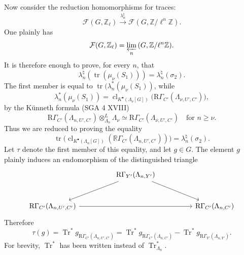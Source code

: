 \documentclass[11pt]{article}
\providecommand{\Tr}{\operatorname{Tr}}
\providecommand{\Tr}{\operatorname{Tr}}
\providecommand{\Tr}{\operatorname{Tr}}
\providecommand{\Tr}{\operatorname{Tr}}
\providecommand{\clKstar}[1]{\operatorname{cl}_{K^{\bullet}(#1)}}
\providecommand{\RG}{\mathrm R\Gamma}
\providecommand{\Tr}{\operatorname{Tr}}
\begin{document}
Now consider the reduction homomorphisms for traces:
\[
\mathcal F(G,\mathbb Z_\ell)\xrightarrow{\lambda_n^\natural}\mathcal F(G,\mathbb Z/\ell^n\mathbb Z).
\]
One plainly has
\[
\mathcal F(G,\mathbb Z_\ell)=\varprojlim_n\mathcal (G,\mathbb Z/\ell^n\mathbb Z).
\]
It is therefore enough to prove, for every $n$, that
\[
\lambda_n^\natural(\operatorname{tr}(\mu_\nu(S_1)))=\lambda_n^\natural(\sigma_2).
\]
The first member is equal to $\operatorname{tr}(\lambda_n^*(\mu_\nu(S_1))$, while
\[
\lambda_n^*(\mu_\nu(S_1))
=
\clKstar{\Lambda_\nu[G]}\bigl(\RG_{C'}(\Lambda_{\nu,U',C'})\bigr),
\]
by the Künneth formula (SGA 4 XVIII)
\[
\RG_{C'}(\Lambda_{n,U',C'})\otimes_{\Lambda_n}^{L}\Lambda_\nu
\simeq \RG_{C'}(\Lambda_{\nu,U',C'})
\quad\text{for } n\ge\nu.
\]
Thus we are reduced to proving the equality
\[
\operatorname{tr}\bigl(\clKstar{\Lambda_n[G]}(\mathbb{R}\Gamma_{C'}(\Lambda_{n,U',C'}))\bigr)
=
\lambda_n^\natural(\sigma_2).
\]
Let $\tau$ denote the first member of this equality, and let $g\in G$. The element $g$ plainly induces an endomorphism of the distinguished triangle
\[
\begin{tikzcd}[column sep=huge,row sep=large]
& \RG_{Y'}(\Lambda_{n,Y'}) \arrow[dl] \arrow[dr] & \\
\RG_{C'}(\Lambda_{n,U',C'}) \arrow[rr] && \RG_{C'}(\Lambda_{n,C'})
\end{tikzcd}
\]
Therefore
\[
\tau(g)=\Tr^*g_{\RG_{C'}(\Lambda_{n,U',C'})}
=\Tr^*g_{\RG_{C'}(\Lambda_{n,C'})}
-\Tr^*g_{\RG_{Y'}(\Lambda_{n,Y'})}.
\]
For brevity, $\Tr^*$ has been written instead of $\Tr^*_{\Lambda_n}$.
\end{document}
